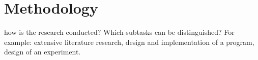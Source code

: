 \section{Methodology}
\label{sec:methodology}
 how is the research conducted? Which subtasks can be distinguished? For example:
extensive literature research, design and implementation of a program, design of an experiment.